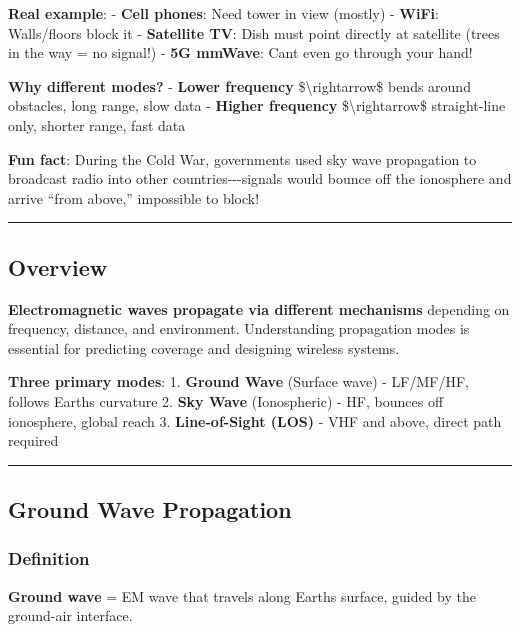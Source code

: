 \textbf{Real example}: - \textbf{Cell phones}: Need tower in view
(mostly) - \textbf{WiFi}: Walls/floors block it - \textbf{Satellite TV}:
Dish must point directly at satellite (trees in the way = no signal!) -
\textbf{5G mmWave}: Can\textquotesingle t even go through your hand!

\textbf{Why different modes?} - \textbf{Lower frequency}
\$\textbackslash rightarrow\$ bends around obstacles, long range, slow
data - \textbf{Higher frequency} \$\textbackslash rightarrow\$
straight-line only, shorter range, fast data

\textbf{Fun fact}: During the Cold War, governments used sky wave
propagation to broadcast radio into other countries-\/-\/-signals would
bounce off the ionosphere and arrive ``from above,'' impossible to
block!

\begin{center}\rule{0.5\linewidth}{0.5pt}\end{center}

\subsection{Overview}\label{overview}

\textbf{Electromagnetic waves propagate via different mechanisms}
depending on frequency, distance, and environment. Understanding
propagation modes is essential for predicting coverage and designing
wireless systems.

\textbf{Three primary modes}: 1. \textbf{Ground Wave} (Surface wave) -
LF/MF/HF, follows Earth\textquotesingle s curvature 2. \textbf{Sky Wave}
(Ionospheric) - HF, bounces off ionosphere, global reach 3.
\textbf{Line-of-Sight (LOS)} - VHF and above, direct path required

\begin{center}\rule{0.5\linewidth}{0.5pt}\end{center}

\subsection{Ground Wave Propagation}\label{ground-wave-propagation}

\subsubsection{Definition}\label{definition}

\textbf{Ground wave} = EM wave that travels along
Earth\textquotesingle s surface, guided by the ground-air interface.

